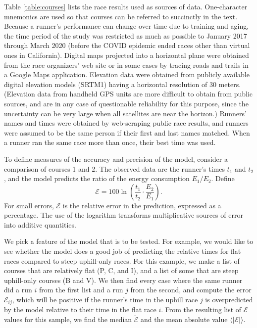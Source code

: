\documentclass[10pt,letterpaper]{article}
\begin{document}
Table \ref{table:courses} lists the race results used as sources of data.
One-character mnemonics are used so that courses can be referred to succinctly in the text.
Because a runner's performance can change over time due to training and aging,
the time period of the study was restricted as much as possible to January 2017 through March 2020
(before the COVID epidemic ended races other than virtual ones in California).
Digital maps projected into a horizontal plane were obtained from the race organizers' web site
or in some cases by tracing roads and trails in a Google Maps application. Elevation data
were obtained from publicly available digital elevation models (SRTM1) having a horizontal
resolution of 30 meters. (Elevation data from handheld GPS units are more difficult to
obtain from public sources, and are in any case of questionable reliability
for this purpose, since the uncertainty can be very large when all satellites are near the
horizon.) Runners' names and times were obtained by web-scraping public race results,
and runners were assumed to be the same person if their first and last names matched.
When a runner ran the same race more than once, their best time was used.

To define measures of the accuracy and precision of the model, consider a comparison
of courses 1 and 2. The observed data are the runner's times $t_1$ and $t_2$, and
the model predicts the ratio of the energy consumption $E_1/E_2$. Define
\begin{equation}
  \mathcal{E} = 100 \ln\left(\frac{t_1}{t_2}\cdot\frac{E_2}{E_1}\right).
\end{equation}
For small errors, $\mathcal{E}$ is the relative error in the prediction, expressed
as a percentage. The use of the logarithm transforms multiplicative sources of
error into additive quantities.

We pick a feature of the model that is to be tested. For example, we would like to see
whether the model does a good job of predicting the relative times for flat races
compared to steep uphill-only races. For this example, we make a list of courses
that are relatively flat (P, C, and I), and a list of some that are steep uphill-only
courses (B and V). We then find every case where the same runner did a run $i$ from the first
list and a run $j$ from the second, and compute the error $\mathcal{E}_{ij}$, which will be
positive if the runner's time in the uphill race $j$ is overpredicted by the model relative
to their time in the flat race $i$. From the resulting list of $\mathcal{E}$ values for
this sample, we find the median $\widetilde{\mathcal{E}}$ and the mean absolute value $\langle|\mathcal{E}|\rangle$.
\end{document}
